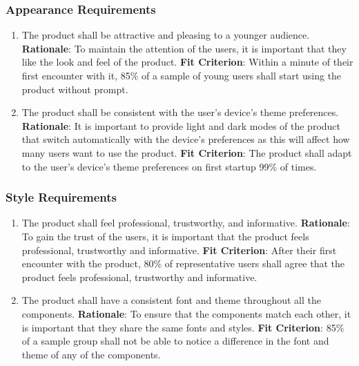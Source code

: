 \documentclass[12pt, titlepage]{article}
\begin{document}
\subsubsection{Appearance Requirements}
\begin{enumerate}[label = NFR-\arabic*, left=\parindent, series=nfr]
    \item The product shall be attractive and pleasing to a younger audience.
    \newline \textbf{Rationale}: To maintain the attention of the users, it is important that they like the look and feel of the product. 
    \newline \textbf{Fit Criterion}: Within a minute of their first encounter with it, 85\% of a sample of young users shall start using the product without prompt.
    \item The product shall be consistent with the user's device's theme preferences.
    \newline \textbf{Rationale}: It is important to provide light and dark modes of the product that switch automatically with the device's preferences as this will affect how many users want to use the product.
    \newline \textbf{Fit Criterion}: The product shall adapt to the user's device's theme preferences on first startup 99\% of times.
\end{enumerate}

\subsubsection{Style Requirements}
\begin{enumerate}[nfr]
    \item The product shall feel professional, trustworthy, and informative.
    \newline \textbf{Rationale}: To gain the trust of the users, it is important that the product feels professional, trustworthy and informative.
    \newline \textbf{Fit Criterion}: After their first encounter with the product, 80\% of representative users shall agree that the product feels professional, trustworthy and informative.
    \item The product shall have a consistent font and theme throughout
    all the components.
    \newline \textbf{Rationale}: To ensure that the components match each other, it is important that they share the same fonts and styles.
    \newline \textbf{Fit Criterion}: 85\% of a sample group shall not be able to notice a difference in the font and theme of any of the components.
\end{enumerate}
\end{document}
